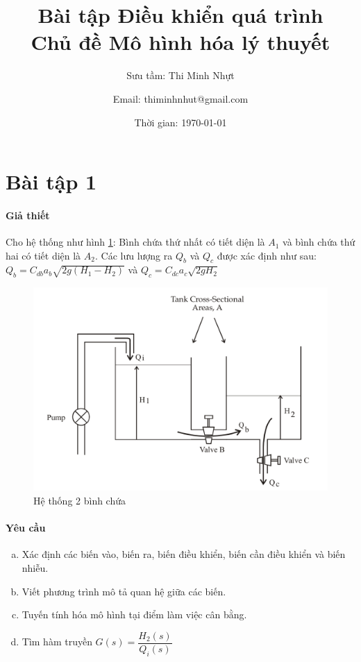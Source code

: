 \documentclass[12pt,a4paper]{article}
\title{\textbf{Bài tập Điều khiển quá trình \bigskip \\ Chủ đề Mô hình hóa lý thuyết}}
\author{Sưu tầm: Thi Minh Nhựt \and Email: thiminhnhut@gmail.com}
\date{Thời gian: \today}
\begin{document}
    \maketitle
    \section{Bài tập 1}
        \paragraph{Giả thiết}
        Cho hệ thống như hình \ref{baitap1}: Bình chứa thứ nhất có tiết diện là $A_1$ và bình chứa thứ hai có tiết diện là $A_2$. Các lưu lượng ra $Q_b$ và $Q_c$ được xác định như sau: $Q_b = C_{db}a_b\sqrt{2g(H_1 - H_2)}$ và $Q_c = C_{dc}a_c\sqrt{2gH_2}$
            \begin{figure}[htp]
                \begin{center}
                    \includegraphics[scale=.3]{bai1}
                \end{center}
                \caption{Hệ thống 2 bình chứa} \label{baitap1}
            \end{figure}

        \paragraph{Yêu cầu}
            \begin{enumerate}[a.]
                \item Xác định các biến vào, biến ra, biến điều khiển, biến cần điều khiển và biến nhiễu.
                \item Viết phương trình mô tả quan hệ giữa các biến.
                \item Tuyến tính hóa mô hình tại điểm làm việc cân bằng.
                \item Tìm hàm truyền $G(s) = \dfrac{H_2(s)}{Q_i(s)}$                                    
            \end{enumerate}
         
\end{document}
